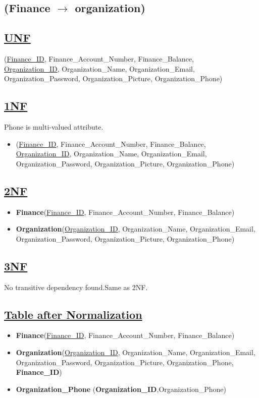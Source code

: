 \subsection{\texorpdfstring{\centering (Finance $\rightarrow$ organization)}{(Finance-organization)}}

\subsection*{\underline{UNF}}

(\underline{Finance\_ID}, Finance\_Account\_Number, Finance\_Balance,\\
\underline{Organization\_ID}, Organization\_Name, Organization\_Email, Organization\_Password, Organization\_Picture, Organization\_Phone)

\subsection*{\underline{1NF}}
Phone is multi-valued attribute.
\vskip 0.2in

\begin{itemize}
    \item
          (\underline{Finance\_ID}, Finance\_Account\_Number, Finance\_Balance,\\
          \underline{Organization\_ID}, Organization\_Name, Organization\_Email, Organization\_Password, Organization\_Picture, Organization\_Phone)
\end{itemize}

\subsection*{\underline{2NF}}
\begin{itemize}
    \item \textbf{Finance}(\underline{Finance\_ID}, Finance\_Account\_Number, Finance\_Balance)
    \item \textbf{Organization}(\underline{Organization\_ID}, Organization\_Name, Organization\_Email, Organization\_Password, Organization\_Picture, Organization\_Phone)
\end{itemize}

\subsection*{\underline{3NF}}
No transitive dependency found.Same as 2NF.

\subsection*{\underline{Table after Normalization}}
\begin{itemize}
    \item \textbf{Finance}(\underline{Finance\_ID}, Finance\_Account\_Number, Finance\_Balance)
    \item \textbf{Organization}(\underline{Organization\_ID}, Organization\_Name, Organization\_Email, Organization\_Password, Organization\_Picture, Organization\_Phone, \textbf{Finance\_ID})
    \item \textbf{Organization\_Phone} (\textbf{Organization\_ID},{Organization\_Phone})
\end{itemize}

\clearpage